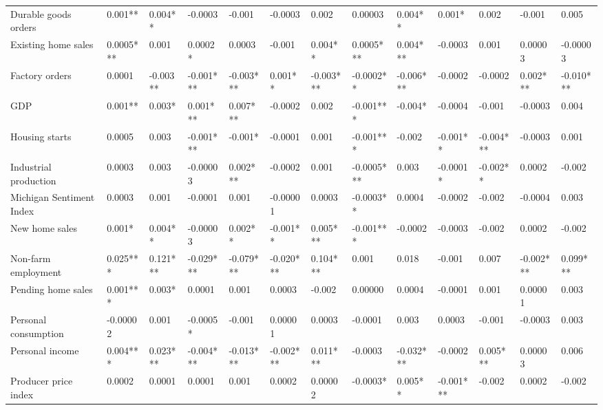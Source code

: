 \begin{landscape}
\begin{table}[]
{\begin{tabular}{lllllllllllll}
Durable goods orders     & 0.001**   & 0.004**  & -0.0003    & -0.001    & -0.0003   & 0.002     & 0.00003    & 0.004**   & 0.001*    & 0.002     & -0.001    & 0.005     \\
Existing home sales      & 0.0005*** & 0.001    & 0.0002*    & 0.0003    & -0.001    & 0.004**   & 0.0005***  & 0.004***  & -0.0003   & 0.001     & 0.00003   & -0.00003  \\
Factory orders           & 0.0001    & -0.003** & -0.001***  & -0.003*** & 0.001**   & -0.003*** & -0.0002**  & -0.006*** & -0.0002   & -0.0002   & 0.002***  & -0.010*** \\
GDP                      & 0.001**   & 0.003*   & 0.001***   & 0.007***  & -0.0002   & 0.002     & -0.001***  & -0.004*   & -0.0004   & -0.001    & -0.0003   & 0.004     \\
Housing starts           & 0.0005    & 0.003    & -0.001***  & -0.001*   & -0.0001   & 0.001     & -0.001***  & -0.002    & -0.001**  & -0.004*** & -0.0003   & 0.001     \\
Industrial production    & 0.0003    & 0.003    & -0.00003   & 0.002***  & -0.0002   & 0.001     & -0.0005*** & 0.003     & -0.0001*  & -0.002**  & 0.0002    & -0.002    \\
Michigan Sentiment Index & 0.0003    & 0.001    & -0.0001    & 0.001     & -0.00001  & 0.0003    & -0.0003**  & 0.0004    & -0.0002   & -0.002    & -0.0004   & 0.003     \\
New home sales           & 0.001*    & 0.004**  & -0.00003   & 0.002**   & -0.001**  & 0.005***  & -0.001***  & -0.0002   & -0.0003   & -0.002    & 0.0002    & -0.002    \\
Non-farm employment      & 0.025***  & 0.121*** & -0.029***  & -0.079*** & -0.020*** & 0.104***  & 0.001      & 0.018     & -0.001    & 0.007     & -0.002*** & 0.099***  \\
Pending home sales       & 0.001***  & 0.003*   & 0.0001     & 0.001     & 0.0003    & -0.002    & 0.00000    & 0.0004    & -0.0001   & 0.001     & 0.00001   & 0.003     \\
Personal consumption     & -0.00002  & 0.001    & -0.0005*   & -0.001    & 0.00001   & 0.0003    & -0.0001    & 0.003     & 0.0003    & -0.001    & -0.0003   & 0.003     \\
Personal income          & 0.004***  & 0.023*** & -0.004***  & -0.013*** & -0.002*** & 0.011***  & -0.0003    & -0.032*** & -0.0002   & 0.005***  & 0.00003   & 0.006     \\
Producer price index     & 0.0002    & 0.0001   & 0.0001     & 0.001     & 0.0002    & 0.00002   & -0.0003*   & 0.005**   & -0.001*** & -0.002    & 0.0002    & -0.002    \\

\end{tabular}}
\end{table}
\end{landscape}
